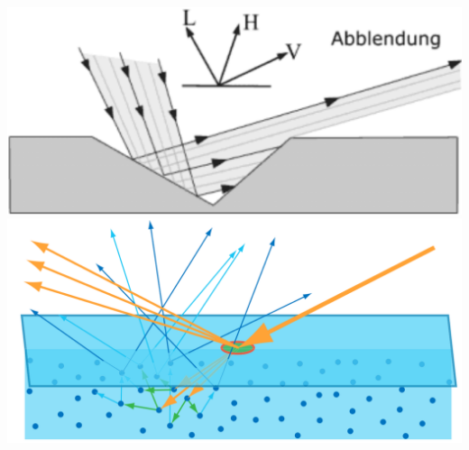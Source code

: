 \documentclass[
  11pt,
  a4paper,
  oneside
  ]{article}
\begin{document}
\includegraphics*[width=0.9 \textwidth]{images/abblendung.png}\\
\includegraphics*[width=0.9 \textwidth]{images/scattering.png}\\
\end{document}
